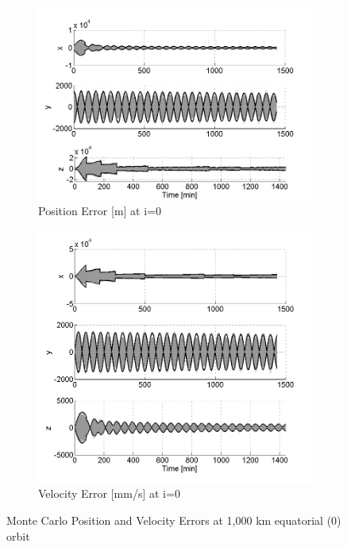 \documentclass[]{aiaa-tc}%
\begin{document}
\begin{figure}[h!]
\centering
\begin{subfigure}{.49\textwidth}
  \centering
  \includegraphics{MC_pos0}
  \caption{Position Error [m] at i=0\degree}
  \label{fig:mcpos0}
\end{subfigure}
\begin{subfigure}{.49\textwidth} 
  \centering
  \includegraphics{MC_vel0}
  \caption{Velocity Error [mm/s] at i=0\degree}
  \label{fig:coastline}
\end{subfigure}
\caption{Monte Carlo Position and Velocity Errors at 1,000 km equatorial (0\degree) orbit}
\label{fig:mcvel0}
\end{figure}
\end{document}
